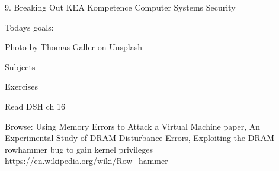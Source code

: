 \documentclass[Screen16to9,17pt]{foils}
\begin{document}
\mytitlepage
{9. Breaking Out}
{KEA Kompetence Computer Systems Security \the\year}




Todays goals:
\begin{list2}
\item
\end{list2}

  Photo by Thomas Galler on Unsplash


\begin{list1}
\item Subjects
\begin{list2}
\item
\end{list2}
\item Exercises
\begin{list2}
\item
\end{list2}
\end{list1}




\begin{list1}
\item Read DSH ch 16
\item Browse: Using Memory Errors to Attack a Virtual Machine paper, An Experimental Study of DRAM Disturbance Errors, Exploiting the DRAM rowhammer bug to gain kernel privileges \url{https://en.wikipedia.org/wiki/Row_hammer}
\end{list1}


\slidenext
\end{document}
